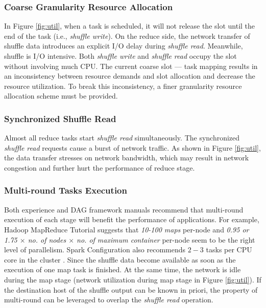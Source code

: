 \subsubsection{Coarse Granularity Resource Allocation}
In Figure \ref{fig:util}, when a task is scheduled, it will not release the slot until the end of the task (i.e., \textit{shuffle write}). On the reduce side, the network transfer of shuffle data introduces an explicit I/O delay during \textit{shuffle read}. Meanwhile, shuffle is I/O intensive. Both \textit{shuffle write} and \textit{shuffle read} occupy the slot without involving much CPU. The current coarse slot --- task mapping results in an inconsistency between resource demands and slot allocation and decrease the resource utilization. To break this inconsistency, a finer granularity resource allocation scheme must be provided.

\subsubsection{Synchronized Shuffle Read}
Almost all reduce tasks start \textit{shuffle read} simultaneously. The synchronized \textit{shuffle read} requests cause a burst of network traffic. As shown in Figure \ref{fig:util}, the data transfer stresses on network bandwidth, which may result in network congestion and further hurt the performance of reduce stage.

\subsubsection{Multi-round Tasks Execution}\label{multi}
Both experience and DAG framework manuals recommend that multi-round execution of each stage will benefit the performance of applications.
For example, Hadoop MapReduce Tutorial  \cite{hadooptutorial} suggests that \textit{10-100 maps} per-node and \textit{0.95 or 1.75 $\times$ no. of nodes $\times$ no. of maximum container} per-node seem to be the right level of parallelism. Spark Configuration also recommends $2-3$ tasks per CPU core in the cluster \cite{sparkconf}.
Since the shuffle data become available as soon as the execution of one map task is finished. At the same time, the network is idle during the map stage (network utilization during map stage in Figure \ref{fig:util}). If the destination host of the shuffle output can be known in priori, the property of multi-round can be leveraged to overlap the \textit{shuffle read} operation.


